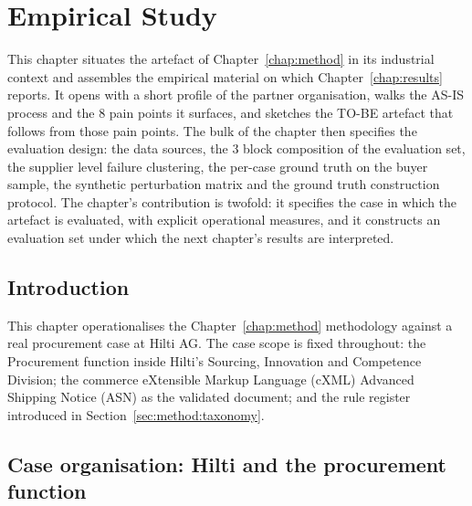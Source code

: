 
\chapter{Empirical Study} \label{chap:empirical}

This chapter situates the artefact of Chapter~\ref{chap:method} in its industrial context and assembles the empirical material on which Chapter~\ref{chap:results} reports. It opens with a short profile of the partner organisation, walks the AS-IS process and the 8 pain points it surfaces, and sketches the TO-BE artefact that follows from those pain points. The bulk of the chapter then specifies the evaluation design: the data sources, the 3 block composition of the evaluation set, the supplier level failure clustering, the per-case ground truth on the buyer sample, the synthetic perturbation matrix and the ground truth construction protocol. The chapter's contribution is twofold: it specifies the case in which the artefact is evaluated, with explicit operational measures, and it constructs an evaluation set under which the next chapter's results are interpreted.


\section{Introduction}
\label{sec:emp:intro}

This chapter operationalises the Chapter~\ref{chap:method} methodology against a real procurement case at Hilti AG. The case scope is fixed throughout: the Procurement function inside Hilti's Sourcing, Innovation and Competence Division; the commerce eXtensible Markup Language (cXML) Advanced Shipping Notice (ASN) as the validated document; and the rule register introduced in Section~\ref{sec:method:taxonomy}.


\section{Case organisation: Hilti and the procurement function}
\label{sec:emp:case}

